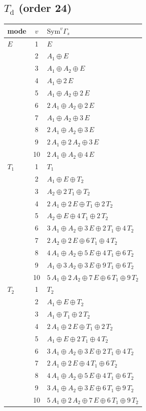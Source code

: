 \documentclass[11pt]{article}
\begin{document}
\subsection*{$T_{\mathrm d}$ \quad (order 24)}
\begin{longtable}{l c p{}}
\hline mode & $v$ & $\mathrm{Sym}^v\Gamma_s$\\ \hline\endhead
$E$ & 1 & $E$\\
 & 2 & $A_{1}\oplus E$\\
 & 3 & $A_{1}\oplus A_{2}\oplus E$\\
 & 4 & $A_{1}\oplus 2\,E$\\
 & 5 & $A_{1}\oplus A_{2}\oplus 2\,E$\\
 & 6 & $2\,A_{1}\oplus A_{2}\oplus 2\,E$\\
 & 7 & $A_{1}\oplus A_{2}\oplus 3\,E$\\
 & 8 & $2\,A_{1}\oplus A_{2}\oplus 3\,E$\\
 & 9 & $2\,A_{1}\oplus 2\,A_{2}\oplus 3\,E$\\
 & 10 & $2\,A_{1}\oplus A_{2}\oplus 4\,E$\\
\hline
$T_{1}$ & 1 & $T_{1}$\\
 & 2 & $A_{1}\oplus E\oplus T_{2}$\\
 & 3 & $A_{2}\oplus 2\,T_{1}\oplus T_{2}$\\
 & 4 & $2\,A_{1}\oplus 2\,E\oplus T_{1}\oplus 2\,T_{2}$\\
 & 5 & $A_{2}\oplus E\oplus 4\,T_{1}\oplus 2\,T_{2}$\\
 & 6 & $3\,A_{1}\oplus A_{2}\oplus 3\,E\oplus 2\,T_{1}\oplus 4\,T_{2}$\\
 & 7 & $2\,A_{2}\oplus 2\,E\oplus 6\,T_{1}\oplus 4\,T_{2}$\\
 & 8 & $4\,A_{1}\oplus A_{2}\oplus 5\,E\oplus 4\,T_{1}\oplus 6\,T_{2}$\\
 & 9 & $A_{1}\oplus 3\,A_{2}\oplus 3\,E\oplus 9\,T_{1}\oplus 6\,T_{2}$\\
 & 10 & $5\,A_{1}\oplus 2\,A_{2}\oplus 7\,E\oplus 6\,T_{1}\oplus 9\,T_{2}$\\
\hline
$T_{2}$ & 1 & $T_{2}$\\
 & 2 & $A_{1}\oplus E\oplus T_{2}$\\
 & 3 & $A_{1}\oplus T_{1}\oplus 2\,T_{2}$\\
 & 4 & $2\,A_{1}\oplus 2\,E\oplus T_{1}\oplus 2\,T_{2}$\\
 & 5 & $A_{1}\oplus E\oplus 2\,T_{1}\oplus 4\,T_{2}$\\
 & 6 & $3\,A_{1}\oplus A_{2}\oplus 3\,E\oplus 2\,T_{1}\oplus 4\,T_{2}$\\
 & 7 & $2\,A_{1}\oplus 2\,E\oplus 4\,T_{1}\oplus 6\,T_{2}$\\
 & 8 & $4\,A_{1}\oplus A_{2}\oplus 5\,E\oplus 4\,T_{1}\oplus 6\,T_{2}$\\
 & 9 & $3\,A_{1}\oplus A_{2}\oplus 3\,E\oplus 6\,T_{1}\oplus 9\,T_{2}$\\
 & 10 & $5\,A_{1}\oplus 2\,A_{2}\oplus 7\,E\oplus 6\,T_{1}\oplus 9\,T_{2}$\\
\hline
\end{longtable}
\end{document}
